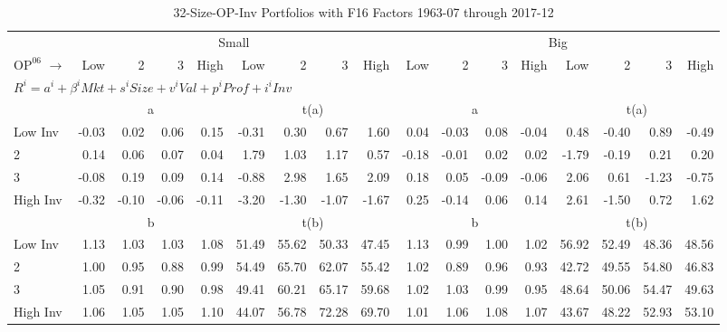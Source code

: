 
\begin{table}[!ht]
\footnotesize
\centering
\caption{32-Size-OP-Inv Portfolios with F16 Factors 1963-07 through 2017-12}
\begin{tabular}{lrrrrrrrrrrrrrrrr}
  \toprule
     & \multicolumn{8}{c}{Small} & \multicolumn{8}{c}{Big}  \\
     \cmidrule(r){2-9} \cmidrule(r){10-17}
    $\text{OP}^{06}$ $\rightarrow$ & Low & 2 & 3 & High & Low & 2 & 3 & High & Low & 2 & 3 & High & Low & 2 & 3 & High  \\ 
  \midrule
  \multicolumn{17}{l}{$R^i=a^i+\beta^iMkt+s^iSize+v^iVal+p^iProf+i^iInv$}  \\
  
     & \multicolumn{4}{c}{a} & \multicolumn{4}{c}{t(a)}  & \multicolumn{4}{c}{a} & \multicolumn{4}{c}{t(a)}   \\
     \cmidrule(r){2-5} \cmidrule(r){6-9}  \cmidrule(r){10-13} \cmidrule(r){14-17} 
    Low Inv  & -0.03  & 0.02  & 0.06  & 0.15  & -0.31  & 0.30  & 0.67  & 1.60  & 0.04  & -0.03  & 0.08  & -0.04  & 0.48  & -0.40  & 0.89  & -0.49   \\
    2  & 0.14  & 0.06  & 0.07  & 0.04  & 1.79  & 1.03  & 1.17  & 0.57  & -0.18  & -0.01  & 0.02  & 0.02  & -1.79  & -0.19  & 0.21  & 0.20   \\
    3  & -0.08  & 0.19  & 0.09  & 0.14  & -0.88  & 2.98  & 1.65  & 2.09  & 0.18  & 0.05  & -0.09  & -0.06  & 2.06  & 0.61  & -1.23  & -0.75   \\
    High Inv  & -0.32  & -0.10  & -0.06  & -0.11  & -3.20  & -1.30  & -1.07  & -1.67  & 0.25  & -0.14  & 0.06  & 0.14  & 2.61  & -1.50  & 0.72  & 1.62   \\
    
  
     & \multicolumn{4}{c}{b} & \multicolumn{4}{c}{t(b)}  & \multicolumn{4}{c}{b} & \multicolumn{4}{c}{t(b)}   \\
     \cmidrule(r){2-5} \cmidrule(r){6-9}  \cmidrule(r){10-13} \cmidrule(r){14-17} 
    Low Inv  & 1.13  & 1.03  & 1.03  & 1.08  & 51.49  & 55.62  & 50.33  & 47.45  & 1.13  & 0.99  & 1.00  & 1.02  & 56.92  & 52.49  & 48.36  & 48.56   \\
    2  & 1.00  & 0.95  & 0.88  & 0.99  & 54.49  & 65.70  & 62.07  & 55.42  & 1.02  & 0.89  & 0.96  & 0.93  & 42.72  & 49.55  & 54.80  & 46.83   \\
    3  & 1.05  & 0.91  & 0.90  & 0.98  & 49.41  & 60.21  & 65.17  & 59.68  & 1.02  & 1.03  & 0.99  & 0.95  & 48.64  & 50.06  & 54.47  & 49.63   \\
    High Inv  & 1.06  & 1.05  & 1.05  & 1.10  & 44.07  & 56.78  & 72.28  & 69.70  & 1.01  & 1.06  & 1.08  & 1.07  & 43.67  & 48.22  & 52.93  & 53.10   \\
    

\end{tabular}
\end{table}
